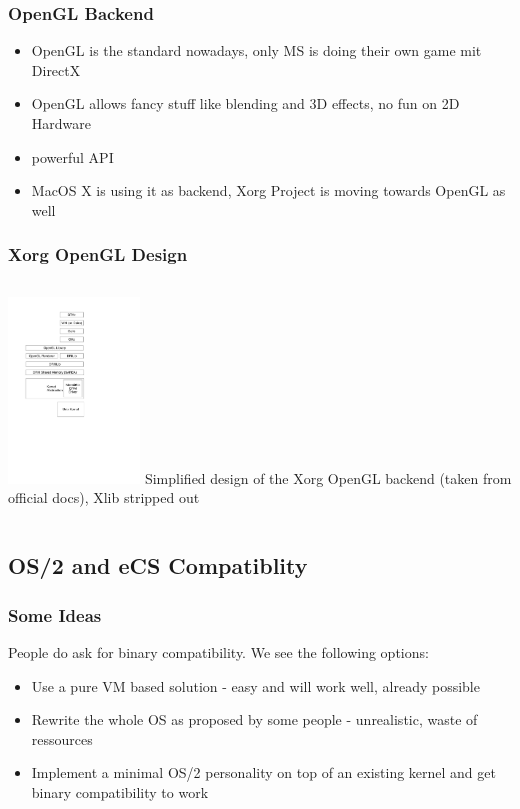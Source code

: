 \documentclass{beamer}
\begin{document}
\begin{frame}
\frametitle{OpenGL Backend}
\begin{itemize}[<+->]
  \item OpenGL is the standard nowadays, only MS is doing their own game mit DirectX
  \item OpenGL allows fancy stuff like blending and 3D effects, no fun on 2D Hardware
  \item powerful API
  \item MacOS X is using it as backend, Xorg Project is moving towards OpenGL as well
\end{itemize}
\end{frame}

\begin{frame}
\frametitle{Xorg OpenGL Design}
\begin{columns}
\column[T]{5cm}
\includegraphics[width=3.5cm]{ogl-backend.pdf}
\column{5cm}
Simplified design of the Xorg OpenGL backend (taken from official docs), Xlib stripped out
\end{columns}
\end{frame}

\subsection{OS/2 and eCS Compatiblity}
\begin{frame}
\frametitle{Some Ideas}
People do ask for binary compatibility. We see the following options:
\begin{itemize}[<+->]
  \item Use a pure VM based solution - easy and will work well, already possible
  \item Rewrite the whole OS as proposed by some people - unrealistic, waste of ressources
  \item Implement a minimal OS/2 personality on top of an existing kernel and get binary compatibility to work
\end{itemize}
\end{frame}
\end{document}
